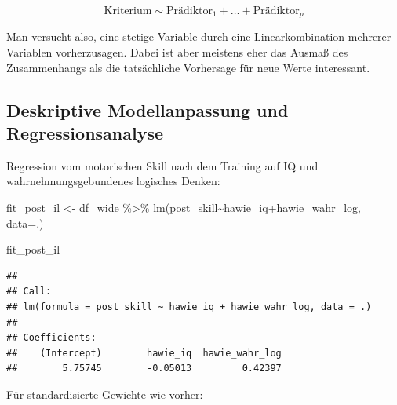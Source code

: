\documentclass[
]{book}
\newenvironment{Shaded}{\begin{snugshade}}{\end{snugshade}}
\newcommand{\AttributeTok}[1]{\textcolor[rgb]{0.77,0.63,0.00}{#1}}
\newcommand{\FunctionTok}[1]{\textcolor[rgb]{0.00,0.00,0.00}{#1}}
\newcommand{\NormalTok}[1]{#1}
\newcommand{\OtherTok}[1]{\textcolor[rgb]{0.56,0.35,0.01}{#1}}
\newcommand{\SpecialCharTok}[1]{\textcolor[rgb]{0.00,0.00,0.00}{#1}}
\begin{document}
\[\text{Kriterium} \sim \text{Prädiktor}_1 + \dots + \text{Prädiktor}_p\]

Man versucht also, eine stetige Variable durch eine Linearkombination mehrerer Variablen vorherzusagen. Dabei ist aber meistens eher das Ausmaß des Zusammenhangs als die tatsächliche Vorhersage für neue Werte interessant.

\hypertarget{deskriptive-modellanpassung-und-regressionsanalyse}{%
\subsection{Deskriptive Modellanpassung und Regressionsanalyse}\label{deskriptive-modellanpassung-und-regressionsanalyse}}

Regression vom motorischen Skill nach dem Training auf IQ und wahrnehmungsgebundenes logisches Denken:

\begin{Shaded}
\begin{Highlighting}[]
\NormalTok{fit\_post\_il }\OtherTok{\textless{}{-}}\NormalTok{ df\_wide }\SpecialCharTok{\%\textgreater{}\%} 
   \FunctionTok{lm}\NormalTok{(post\_skill}\SpecialCharTok{\textasciitilde{}}\NormalTok{hawie\_iq}\SpecialCharTok{+}\NormalTok{hawie\_wahr\_log, }
      \AttributeTok{data=}\NormalTok{.)}

\NormalTok{fit\_post\_il}
\end{Highlighting}
\end{Shaded}

\begin{verbatim}
## 
## Call:
## lm(formula = post_skill ~ hawie_iq + hawie_wahr_log, data = .)
## 
## Coefficients:
##    (Intercept)        hawie_iq  hawie_wahr_log  
##        5.75745        -0.05013         0.42397
\end{verbatim}

Für standardisierte Gewichte wie vorher:

\begin{Shaded}
\end{Shaded}
\end{document}
